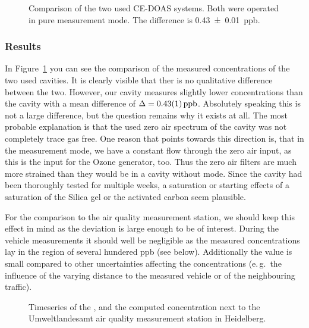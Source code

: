 \begin{figure}[htbp]
  \centering
  
  \caption{Comparison of the two used CE-DOAS systems. Both were
    operated in pure  measurement mode. The difference is
    \SI{0.43 \pm 0.01}{ppb}.}
  \label{fig:hd-comparison}
\end{figure}

\subsubsection{Results}
\label{sec:vehicle-results}

In Figure~\ref{fig:hd-comparison} you can see the comparison of the
measured  concentrations of the two used cavities. It is
clearly visible that ther is no qualitative difference between the
two. However, our  cavity measures slightly lower
concentrations than the  cavity with a mean difference of
$\Delta = \SI{0.43\pm0.01}{ppb}$. Absolutely speaking this is not a
large difference, but the question remains why it exists at all. The
most probable explanation is that the used zero air spectrum of the
 cavity was not completely trace gas free. One reason that
points towards this direction is, that in the  measurement
mode, we have a constant flow through the zero air input, as this is
the input for the Ozone generator, too. Thus the zero air filters are much
more strained than they would be in a cavity without 
mode. Since the cavity had been thoroughly tested for multiple
weeks, a saturation or starting effects of a saturation of
the Silica gel or the activated carbon seem plausible.

For the comparison to the air quality measurement station, we should
keep this effect in mind as the deviation is large enough to be of
interest. During the vehicle measurements it should well be
negligible as the measured concentrations lay in the region of several
hundered \si{ppb} (see below). Additionally the value is small
compared to other uncertainties affecting the concentrations
(e.\,g.\ the influence of the varying distance to the measured
vehicle or of the neighbouring traffic).

\begin{figure}[htbp]
  \centering
  
  \caption{Timeseries of the ,  and the computed
     concentration next to the Umweltlandesamt air quality
    measurement station in Heidelberg.}
  \label{fig:umba}
\end{figure}

